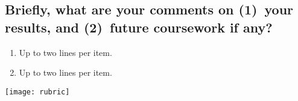 \subsection{Briefly, what are your comments on (1)~your results, and  (2)~future coursework if any?}
\begin{enumerate}
	\item Up to two lines per item.
	\item Up to two lines per item.
\end{enumerate}	




\newpage
\begin{figure*}[!t]
	\texttt{[image: rubric]} 
\end{figure*}
\cleardoublepage

